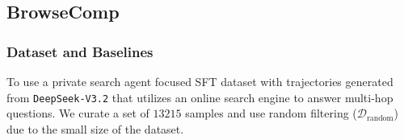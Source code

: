 \subsection{BrowseComp}
\subsubsection{Dataset and Baselines}
To use a private search agent focused SFT dataset with trajectories generated from \texttt{DeepSeek-V3.2} that utilizes an online search engine to answer multi-hop questions. We curate a set of $13215$ samples and use random filtering ($\mathcal{D}_{\text{random}}$) due to the small size of the dataset.
